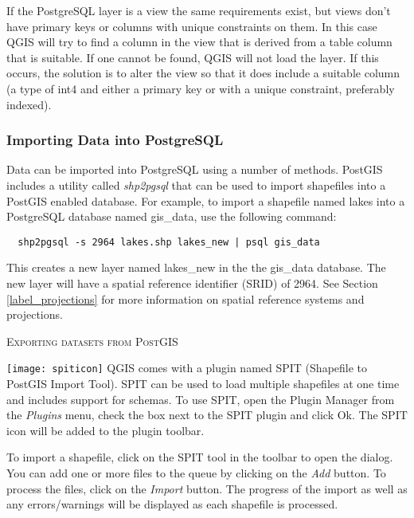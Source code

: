 If the PostgreSQL layer is a view the same requirements exist, but
views don't have primary keys or columns with unique constraints on
them. In this case QGIS will try to find a column in the view that is
derived from a table column that is suitable. If one cannot be found,
QGIS will not load the layer. If this occurs, the solution is to alter
the view so that it does include a suitable column (a type of int4
and either a primary key or with a unique constraint, preferably indexed).

\subsubsection{Importing Data into PostgreSQL}\label{sec:loading_postgis_data}

Data can be imported into PostgreSQL using a number of methods. PostGIS
includes a utility called \textsl{shp2pgsql} that can be used to import shapefiles into
a PostGIS enabled database. For example, to import a shapefile named lakes 
into a PostgreSQL database named gis\_data, use the following command:

\begin{verbatim} 
  shp2pgsql -s 2964 lakes.shp lakes_new | psql gis_data
\end{verbatim}

This creates a new layer named lakes\_new in the the gis\_data database. The
new layer will have a spatial reference identifier (SRID) of 2964. See Section 
\ref{label_projections} for more information on spatial reference systems and
projections.
\begin{Tip}
\caption{\textsc{Exporting datasets from PostGIS}}
\end{Tip}

\texttt{[image: spiticon]} QGIS comes with a
plugin named 
SPIT (Shapefile to PostGIS Import Tool).
SPIT can be used to load multiple shapefiles at one time and includes support
for schemas. To use SPIT, open the Plugin Manager from the \textit{Plugins} menu, check the box next to the SPIT plugin and click Ok. The SPIT
icon will be added to the plugin toolbar. 

To import a shapefile, click on the SPIT tool in the toolbar to open the
dialog.
You can add one or more files to the queue by clicking on the \textsl{Add}
button. To process the files, click on the \textsl{Import} button. The progress of the
import as well as any errors/warnings will be displayed as each shapefile is
processed.  

